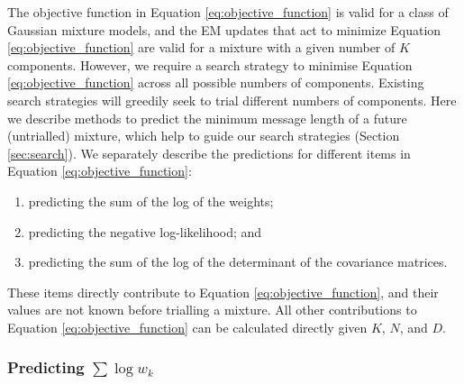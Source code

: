 \documentclass{elsarticle}
\def\weight{w}
\begin{document}
The objective function in Equation \ref{eq:objective_function} is valid for a class of 
Gaussian mixture models,  and the EM updates that act to minimize Equation \ref{eq:objective_function} are valid for a mixture with a given number of $K$ components. However, we require a search strategy to minimise Equation \ref{eq:objective_function} across all possible numbers of components. Existing search strategies will greedily  seek to trial different numbers of components. Here we describe methods to predict the minimum message length of a future (untrialled) mixture, which help to guide our search strategies (Section \ref{sec:search}). We separately describe the predictions for different items in Equation \ref{eq:objective_function}:
\begin{enumerate}
	\item predicting the sum of the log of the weights;
	\item predicting the negative log-likelihood; and
	\item predicting the sum of the log of the determinant of the covariance matrices.
\end{enumerate}

These items directly contribute to Equation \ref{eq:objective_function}, and their values are not known before trialling a mixture. All other contributions to Equation \ref{eq:objective_function} can be calculated directly given $K$, $N$, and $D$.

\subsubsection{Predicting $\sum\log\weight_k$}	
\end{document}

